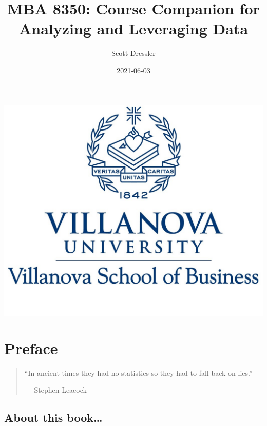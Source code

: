 \documentclass[
]{book}
\title{MBA 8350: Course Companion for Analyzing and Leveraging Data}
\author{Scott Dressler}
\date{2021-06-03}
\begin{document}
\maketitle

{
\setcounter{tocdepth}{1}
\tableofcontents
}
\hypertarget{section}{%
\chapter*{}\label{section}}

\begin{center}\includegraphics[width=14.36in]{images/VU17BLUE3} \end{center}

\hypertarget{preface}{%
\chapter*{Preface}\label{preface}}

\begin{quote}
``In ancient times they had no statistics so they had to fall back on lies.''

--- Stephen Leacock
\end{quote}

\hypertarget{about-this-book}{%
\section*{About this book\ldots{}}\label{about-this-book}}
\end{document}
